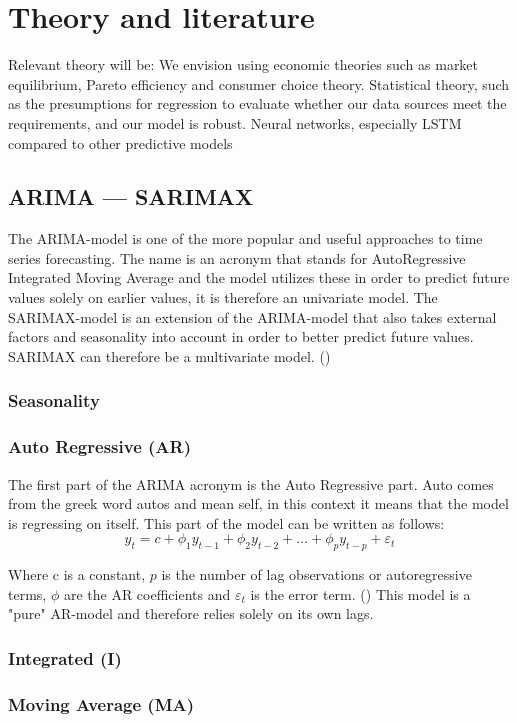 \section{Theory and literature}

Relevant theory will be: 
We envision using economic theories such as market equilibrium, Pareto efficiency and consumer choice theory. 
Statistical theory, such as the presumptions for regression to evaluate whether our data sources meet the requirements, and our model is robust. 
Neural networks, especially LSTM compared to other predictive models 

\subsection{ARIMA --- SARIMAX}
The ARIMA-model is one of the more popular and useful approaches to time series forecasting. The name is an acronym that stands for AutoRegressive Integrated Moving Average and the model utilizes these in order to predict future values solely on earlier values, it is therefore an univariate model. The SARIMAX-model is an extension of the ARIMA-model that also takes external factors and seasonality into account in order to better predict future values. SARIMAX can therefore be a multivariate model. (\cite{hyndman_athanasopoulos_2021})

\subsubsection{Seasonality}

\subsubsection{Auto Regressive (AR)}
The first part of the ARIMA acronym is the Auto Regressive part. Auto comes from the greek word autos and mean self, in this context it means that the model is regressing on itself. This part of the model can be written as follows:
\begin{equation}
y_{t} = c + \phi_{1}y_{t-1} + \phi_{2}y_{t-2} + \dots + \phi_{p}y_{t-p} + \varepsilon_{t}
\end{equation}

Where c is a constant, $p$ is the number of lag observations or autoregressive terms, $\phi$ are the AR coefficients and $\varepsilon_{t}$ is the error term. (\cite{oracle_ARIMA}) This model is a "pure" AR-model and therefore relies solely on its own lags. 


\subsubsection{Integrated (I)}

\subsubsection{Moving Average (MA)}

